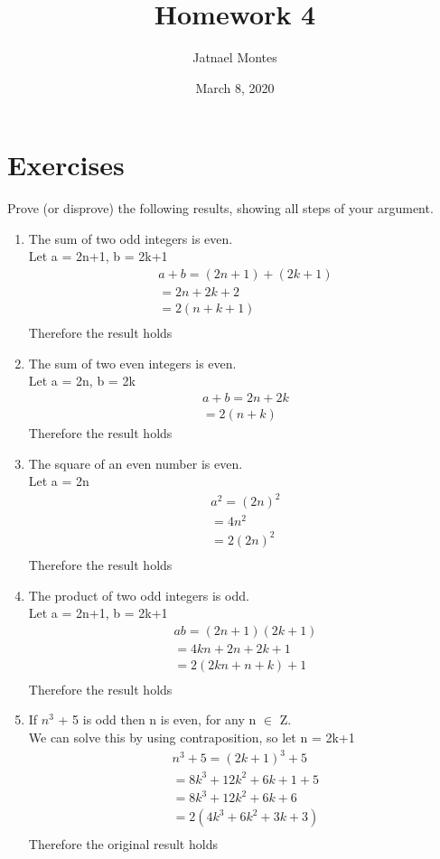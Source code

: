 \documentclass{article}
\title{Homework 4}
\author{Jatnael Montes }
\date{March 8, 2020}
\begin{document}
\maketitle

\section*{Exercises}
Prove (or disprove) the following results, showing all steps of your argument.
\begin{enumerate}
\item The sum of two odd integers is even. \\
Let a = 2n+1, b = 2k+1 
\begin{align*}
a + b = (2n + 1) + (2k + 1) \\
= 2n + 2k + 2\\
= 2(n + k + 1)\\
\end{align*}
Therefore the result holds



\item The sum of two even integers is even. \\
Let a = 2n, b = 2k 
\begin{align*}
a + b = 2n + 2k \\
= 2(n + k)
\end{align*}
Therefore the result holds

\item The square of an even number is even. \\
Let a = 2n
\begin{align*}
a^2 = (2n)^2 \\
=4n^2 \\
= 2(2n)^2 \\
\end{align*}
Therefore the result holds

\item The product of two odd integers is odd. \\
Let a = 2n+1, b = 2k+1 
\begin{align*}
ab = (2n + 1)(2k + 1) \\
= 4kn + 2n + 2k + 1 \\
= 2(2kn + n + k) + 1 \\
\end{align*}
Therefore the result holds

\item If $n^3$ + 5 is odd then n is even, for any n $\in$ Z. \\
We can solve this by using contraposition, so let n = 2k+1
\begin{align*}
n^3 + 5 = (2k + 1)^3 + 5 \\
= 8k^3 + 12k^2 + 6k + 1 + 5\\
= 8k^3 + 12k^2 + 6k + 6 \\
= 2(4k^3 + 6k^2 + 3k + 3) \\
\end{align*}
Therefore the original result holds


\end{enumerate}
\end{document}
